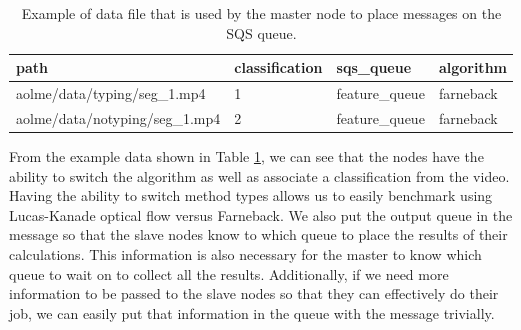 \begin{table}[h]
  \centering
  \begin{tabular}{ | l | l | l | l|}
  \hline
  \textbf{path} & \textbf{classification} & \textbf{sqs\_queue} & \textbf{algorithm}\\ \hline
  aolme/data/typing/seg\_1.mp4 & 1 & feature\_queue & farneback \\ \hline
  aolme/data/notyping/seg\_1.mp4 & 2 & feature\_queue & farneback \\
  \hline
  \end{tabular}
  \caption{Example of data file that is used by the master node to place messages on
  the SQS queue. }
  \label{tab:message_queue}
\end{table}


From the example data shown in Table \ref{tab:message_queue}, we can see that
the nodes have the ability to switch the algorithm as well as associate a
classification from the video. Having the ability to switch method types allows
us to easily benchmark using Lucas-Kanade optical flow versus Farneback.
We also put the output queue in the message so that the slave nodes know to which
queue to place the results of their calculations. This information is also necessary
for the master to know which queue to wait on to collect all the results. Additionally,
if we need more information to be passed to the slave nodes so that they can
effectively do their job, we can easily put that information in the queue with
the message trivially.

